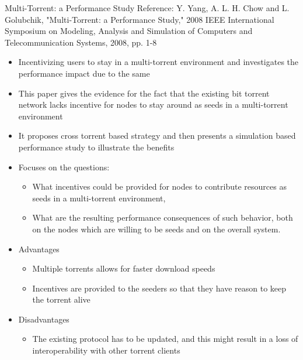 \documentclass[9pt]{beamer}
\begin{document}
\begin{frame}{Multi-Torrent: a Performance Study}
     \small Reference: Y. Yang, A. L. H. Chow and L. Golubchik, "Multi-Torrent: a Performance Study," 2008 IEEE International Symposium on Modeling, Analysis and Simulation of Computers and Telecommunication Systems, 2008, pp. 1-8
    \break
    \begin{itemize}
        \item Incentivizing users to stay in a multi-torrent environment and investigates the performance impact due to the same 
        \item
            This paper gives the evidence for the fact that the existing bit torrent network lacks incentive for nodes to stay around as seeds in a multi-torrent environment
        \item It proposes cross torrent based strategy and then presents a simulation based performance study to illustrate the benefits
        \item Focuses on the questions:
           \begin{itemize}
               \item What incentives could be provided for nodes to contribute resources as seeds in a multi-torrent environment,
               \item What are the resulting performance consequences of such behavior, both on the nodes which are willing to be seeds and on the overall system.
           \end{itemize}
\end{itemize}
\end{frame}
\begin{frame}
    \begin{itemize}
\item Advantages
        \begin{itemize}
            \item Multiple torrents allows for faster download speeds
            \item Incentives are provided to the seeders so that they have reason to keep the torrent alive
        \end{itemize}
        \item Disadvantages
        \begin{itemize}
            \item The existing protocol has to be updated, and this might result in a loss of interoperability with other torrent clients
        \end{itemize}
    \end{itemize}
\end{frame}
\end{document}
